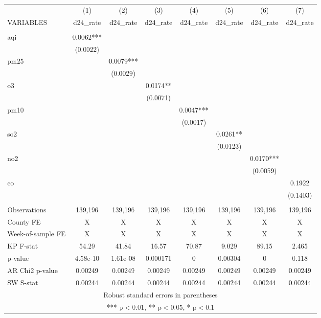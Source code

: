 \documentclass[]{article}
\begin{document}
\begin{tabular}{lccccccc} \hline
 & (1) & (2) & (3) & (4) & (5) & (6) & (7) \\
VARIABLES & d24\_rate & d24\_rate & d24\_rate & d24\_rate & d24\_rate & d24\_rate & d24\_rate \\ \hline
 &  &  &  &  &  &  &  \\
aqi & 0.0062*** &  &  &  &  &  &  \\
 & (0.0022) &  &  &  &  &  &  \\
pm25 &  & 0.0079*** &  &  &  &  &  \\
 &  & (0.0029) &  &  &  &  &  \\
o3 &  &  & 0.0174** &  &  &  &  \\
 &  &  & (0.0071) &  &  &  &  \\
pm10 &  &  &  & 0.0047*** &  &  &  \\
 &  &  &  & (0.0017) &  &  &  \\
so2 &  &  &  &  & 0.0261** &  &  \\
 &  &  &  &  & (0.0123) &  &  \\
no2 &  &  &  &  &  & 0.0170*** &  \\
 &  &  &  &  &  & (0.0059) &  \\
co &  &  &  &  &  &  & 0.1922 \\
 &  &  &  &  &  &  & (0.1403) \\
 &  &  &  &  &  &  &  \\
Observations & 139,196 & 139,196 & 139,196 & 139,196 & 139,196 & 139,196 & 139,196 \\
County FE & X & X & X & X & X & X & X \\
Week-of-sample FE & X & X & X & X & X & X & X \\
KP F-stat & 54.29 & 41.84 & 16.57 & 70.87 & 9.029 & 89.15 & 2.465 \\
p-value & 4.58e-10 & 1.61e-08 & 0.000171 & 0 & 0.00304 & 0 & 0.118 \\
AR Chi2 p-value & 0.00249 & 0.00249 & 0.00249 & 0.00249 & 0.00249 & 0.00249 & 0.00249 \\
 SW S-stat & 0.00244 & 0.00244 & 0.00244 & 0.00244 & 0.00244 & 0.00244 & 0.00244 \\ \hline
\multicolumn{8}{c}{ Robust standard errors in parentheses} \\
\multicolumn{8}{c}{ *** p$<$0.01, ** p$<$0.05, * p$<$0.1} \\
\end{tabular}
\end{document}
